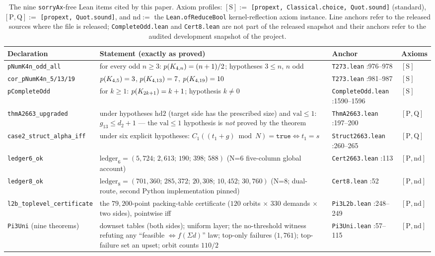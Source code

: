 \begin{table}[ht]
\centering\small
\caption{The nine \texttt{sorryAx}-free Lean items cited by this paper.
Axiom profiles: $[\mathrm{S}]:=$ \texttt{[propext, Classical.choice,
Quot.sound]} (standard), $[\mathrm{P},\mathrm{Q}]:=$
\texttt{[propext, Quot.sound]}, and $\mathrm{nd}:=$ the
\texttt{Lean.ofReduceBool} kernel-reflection axiom instance. Line anchors
refer to the released sources where the file is released;
\texttt{CompleteOdd.lean} and \texttt{Cert8.lean} are not part of the
released snapshot and their anchors refer to the audited development
snapshot of the project.}
\label{sta:tab-leanitems}
\begin{tabular}{p{3.55cm} p{4.55cm} p{2.7cm} p{2.0cm}}
\hline
Declaration & Statement (exactly as proved) & Anchor & Axioms\\
\hline
\texttt{pNumK4n\_odd\_all} & for every odd $n\ge3$:
$p(K_{4,n})=(n+1)/2$; hypotheses $3\le n$, $n$ odd & \texttt{T273.lean}
:976--978 & $[\mathrm{S}]$\\
\texttt{cor\_pNumK4n\_5/13/19} & $p(K_{4,5})=3$,
$p(K_{4,13})=7$, $p(K_{4,19})=10$ & \texttt{T273.lean} :981--987 &
$[\mathrm{S}]$\\
\texttt{pCompleteOdd} & for $k\ge1$: $p(K_{2k+1})=k+1$; hypothesis
$k\ne0$ & \texttt{CompleteOdd.lean} :1590--1596 & $[\mathrm{S}]$\\
\texttt{thmA2663\_upgraded} & under hypotheses
$\mathrm{hd2}$ (target side has the prescribed size) and
$\mathrm{val}\le1$: $g_{13}\le d_2+1$ --- the $\mathrm{val}\le1$
hypothesis is \emph{not} proved by the theorem &
\texttt{ThmA2663.lean} :197--200 & $[\mathrm{P},\mathrm{Q}]$\\
\texttt{case2\_struct\_alpha\_iff} & under six explicit hypotheses:
$C_1((t_1+g)\bmod N)=\texttt{true}\iff t_1=s$ & \texttt{Struct2663.lean}
:260--265 & $[\mathrm{P},\mathrm{Q}]$\\
\texttt{ledger6\_ok} & $\mathrm{ledger}_6=(5{,}724;\,2{,}613;\,190;\,398;\,588)$
(N=6 five-column global account) & \texttt{Cert2663.lean} :113 &
$[\mathrm{P},\mathrm{nd}]$\\
\texttt{ledger8\_ok} & $\mathrm{ledger}_8=(701{,}360;\,285{,}372;\,20{,}308;\,10{,}452;\,30{,}760)$
(N=8; dual-route, second Python implementation pinned) &
\texttt{Cert8.lean} :52 & $[\mathrm{P},\mathrm{nd}]$\\
\texttt{l2b\_toplevel\_certificate} & the $79{,}200$-point packing-table
certificate ($120$ orbits $\times$ $330$ demands $\times$ two sides),
pointwise iff & \texttt{Pi3L2b.lean} :248--249 & $[\mathrm{P},\mathrm{nd}]$\\
\texttt{Pi3Uni} (nine theorems) & downset tables (both sides); uniform
layer; the no-threshold witness refuting any ``feasible $\iff
f(\Sigma d)$'' law; top-only failures ($1{,}761$); top-failure set an
upset; orbit counts $110/2$ & \texttt{Pi3Uni.lean} :57--115 &
$[\mathrm{P},\mathrm{nd}]$\\
\hline
\end{tabular}
\end{table}

